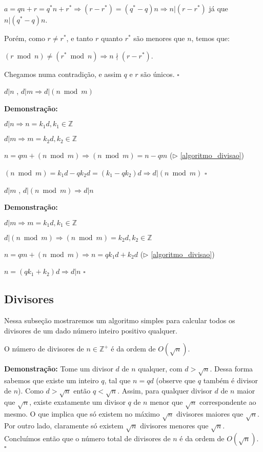 $a = qn + r = q^*n + r^* \Rightarrow (r - r^*) = (q^* - q)n \Rightarrow n|(r - r^*)$ já que $n|(q^* - q)n$.

Porém, como $r \neq r^*$, e tanto $r$ quanto $r^*$ são menores que $n$, temos que: 

$(r\bmod n) \neq (r^*\bmod n) \Rightarrow n \nmid (r - r^*)$.

Chegamos numa contradição, e assim $q$ e $r$ são únicos. $\square$ \\

\begin{corollary}\label{divisibilidade_modular}
$d|n$ , $d|m \Rightarrow d|(n \bmod m)$
\end{corollary}
\textbf{Demonstração:}

$d|n \Rightarrow n = k_1d, k_1 \in \mathbb{Z}$

$d|m \Rightarrow m = k_2d, k_2 \in \mathbb{Z}$

$n = qm + (n \bmod m) \Rightarrow (n \bmod m) = n - qm$ ($\triangleright$ \autoref{algoritmo_divisao})

$(n \bmod m) = k_1d - qk_2d = (k_1 - qk_2)d \Rightarrow d|(n \bmod m)$ $\square$


\begin{corollary}\label{divisibilidade_modular2}
$d|m$ , $d|(n \bmod m) \Rightarrow d|n$
\end{corollary}
\textbf{Demonstração:}

$d|m \Rightarrow m = k_1d, k_1 \in \mathbb{Z}$

$d|(n \bmod m) \Rightarrow (n \bmod m) = k_2d, k_2 \in \mathbb{Z}$

$n = qm + (n \bmod m) \Rightarrow n = qk_1d + k_2d$ ($\triangleright$ \autoref{algoritmo_divisao})

$n = (qk_1 + k_2)d \Rightarrow d|n$ $\square$


\subsection{Divisores}
Nessa subseção mostraremos um algoritmo simples para calcular todos os divisores de um dado número inteiro positivo qualquer.

\begin{theorem} 
O número de divisores de $n \in \mathbb{Z}^{+}$ é da ordem de $O(\sqrt{n})$.
\end{theorem}
\textbf{Demonstração:}
Tome um divisor $d$ de $n$ qualquer, com $d > \sqrt{n}$. Dessa forma sabemos que existe um inteiro $q$, tal que $n=qd$ (observe que $q$ também é divisor de $n$). 
Como $d > \sqrt{n}$ então $q < \sqrt{n}$. Assim, para qualquer divisor $d$ de $n$ maior que $\sqrt{n}$, existe exatamente um divisor $q$ de $n$ menor que $\sqrt{n}$ correspondente ao mesmo.
O que implica que só existem no máximo $\sqrt{n}$ divisores maiores que $\sqrt{n}$. Por outro lado, claramente só existem $\sqrt{n}$ divisores menores que $\sqrt{n}$.
Concluímos então que o número total de divisores de $n$ é da ordem de $O(\sqrt{n})$. $\square$
\\

